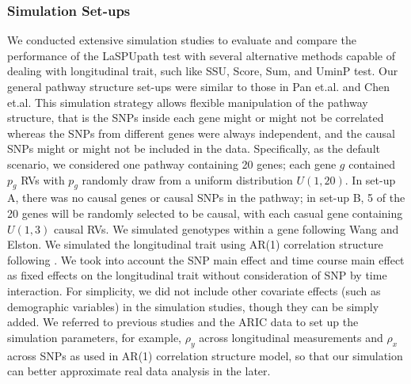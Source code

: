 \documentclass[12pt]{article}
\begin{document}
\subsubsection{Simulation Set-ups}\label{sec:sim_pathway_test}
We conducted extensive simulation studies to evaluate and compare the performance of the LaSPUpath test with several alternative methods capable of dealing with longitudinal trait, such like SSU, Score, Sum, and UminP test. Our general pathway structure set-ups were similar to those in Pan et.al.\cite{Pan2015} and Chen et.al.\cite{Chen2010} This simulation strategy allows flexible manipulation of the pathway structure, that is the SNPs inside each gene might or might not be correlated whereas the SNPs from different genes were always independent, and the causal SNPs might or might not be included in the data. Specifically, as the default scenario, we considered one pathway containing 20 genes; each gene $g$ contained $p_g$ RVs with $p_g$ randomly draw from a uniform distribution $U(1,20)$. In set-up A, there was no causal genes or causal SNPs in the pathway; in set-up B, 5 of the 20 genes will be randomly selected to be causal, with each casual gene containing $U(1,3)$ causal RVs. We simulated genotypes within a gene following Wang and Elston.\cite{Wang2007} We simulated the longitudinal trait using AR(1) correlation structure following \cite{Song2013}. We took into account the SNP main effect and time course main effect as fixed effects on the longitudinal trait {without consideration of SNP by time interaction}. For simplicity, we did not include other covariate effects (such as demographic variables) in the simulation studies, though they can be simply added. We referred to previous studies \cite{pan2014powerful,Basu2011,Pan2011,Han2010,Pan2009} and the ARIC data to set up the simulation parameters, for example, $\rho_y$ across longitudinal measurements and $\rho_x$ across SNPs as used in AR(1) correlation structure model, so that our simulation can better approximate real data analysis in the later.

\end{document}
